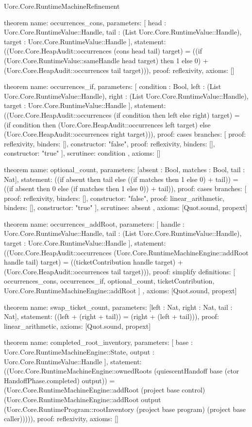 \begin{lexlean}{Uorc.Core.RuntimeMachineRefinement}
\begin{semanticmodule}
theorem{
  name: occurrences_cons,
  parameters: [
    head : Uorc.Core.RuntimeValue::Handle,
    tail : (List Uorc.Core.RuntimeValue::Handle),
    target : Uorc.Core.RuntimeValue::Handle
  ],
  statement: ((Uorc.Core.HeapAudit::occurrences (cons head tail) target) = ((if (Uorc.Core.RuntimeValue::sameHandle head target) then 1 else 0) + (Uorc.Core.HeapAudit::occurrences tail target))),
  proof: reflexivity{},
  axioms: []
}

theorem{
  name: occurrences_if,
  parameters: [
    condition : Bool,
    left : (List Uorc.Core.RuntimeValue::Handle),
    right : (List Uorc.Core.RuntimeValue::Handle),
    target : Uorc.Core.RuntimeValue::Handle
  ],
  statement: ((Uorc.Core.HeapAudit::occurrences (if condition then left else right) target) = (if condition then (Uorc.Core.HeapAudit::occurrences left target) else (Uorc.Core.HeapAudit::occurrences right target))),
  proof: cases{
    branches: [
      {proof: reflexivity{}, binders: [], constructor: "false"},
      {proof: reflexivity{}, binders: [], constructor: "true"}
    ],
    scrutinee: condition
  },
  axioms: []
}

theorem{
  name: optional_count,
  parameters: [absent : Bool, matches : Bool, tail : Nat],
  statement: ((if absent then tail else ((if matches then 1 else 0) + tail)) = ((if absent then 0 else (if matches then 1 else 0)) + tail)),
  proof: cases{
    branches: [
      {proof: reflexivity{}, binders: [], constructor: "false"},
      {proof: linear_arithmetic{}, binders: [], constructor: "true"}
    ],
    scrutinee: absent
  },
  axioms: [Quot.sound, propext]
}

theorem{
  name: occurrences_addRoot,
  parameters: [
    handle : Uorc.Core.RuntimeValue::Handle,
    tail : (List Uorc.Core.RuntimeValue::Handle),
    target : Uorc.Core.RuntimeValue::Handle
  ],
  statement: ((Uorc.Core.HeapAudit::occurrences (Uorc.Core.RuntimeMachineEngine::addRoot handle tail) target) = ((ticketContribution handle target) + (Uorc.Core.HeapAudit::occurrences tail target))),
  proof: simplify{
    definitions: [
      occurrences_cons,
      occurrences_if,
      optional_count,
      ticketContribution,
      Uorc.Core.RuntimeMachineEngine::addRoot
    ]
  },
  axioms: [Quot.sound, propext]
}

theorem{
  name: swap_ticket_count,
  parameters: [left : Nat, right : Nat, tail : Nat],
  statement: ((left + (right + tail)) = (right + (left + tail))),
  proof: linear_arithmetic{},
  axioms: [Quot.sound, propext]
}

theorem{
  name: completed_root_inventory,
  parameters: [
    base : Uorc.Core.RuntimeMachineEngine::State,
    output : Uorc.Core.RuntimeValue::Handle
  ],
  statement: ((Uorc.Core.RuntimeMachineEngine::ownedRoots (quiescentHandoff base (ctor HandoffPhase.completed) output)) = (Uorc.Core.RuntimeMachineEngine::addRoot (project base control) (Uorc.Core.RuntimeMachineEngine::addRoot output (Uorc.Core.RuntimeProgram::rootInventory (project base program) (project base caller))))),
  proof: reflexivity{},
  axioms: []
}


\end{semanticmodule}
\end{lexlean}
